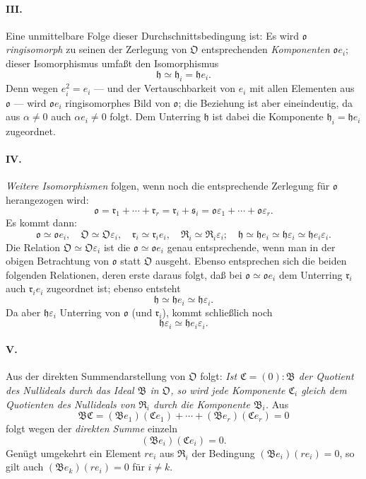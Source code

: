 \paragraph{III.}
Eine unmittelbare Folge dieser Durchschnittsbedingung ist: Es wird $\mathfrak o$ \emph{ringisomorph} zu seinen der Zerlegung von $\mathfrak O$ entsprechenden \emph{Komponenten} $\mathfrak o e_i$; dieser Isomorphismus umfaßt den Isomorphismus
\[
\mathfrak h\simeq\mathfrak h_i=\mathfrak h e_i.
\]
Denn wegen $e_i^2=e_i$ --- und der Vertauschbarkeit von $e_i$ mit allen Elementen aus $\mathfrak o$ --- wird $\mathfrak o e_i$ ringisomorphes Bild von $\mathfrak o$; die Beziehung ist aber eineindeutig, da aus $\alpha\ne0$ auch $\alpha e_i\ne0$ folgt. Dem Unterring $\mathfrak h$ ist dabei die Komponente $\mathfrak h_i=\mathfrak h e_i$ zugeordnet.

\paragraph{IV.}
\emph{Weitere Isomorphismen} folgen, wenn noch die entsprechende Zerlegung für $\mathfrak o$ herangezogen wird:
\[
\mathfrak o=\mathfrak r_1+\cdots+\mathfrak r_r
=\mathfrak r_i+\mathfrak s_i
=\mathfrak o\varepsilon_1+\cdots+\mathfrak o\varepsilon_r.
\]
Es kommt dann:
\[
\mathfrak o\simeq\mathfrak o e_i,
\quad \mathfrak O\simeq\mathfrak O\varepsilon_i,
\quad \mathfrak r_i\simeq\mathfrak r_i e_i,
\quad \mathfrak R_i\simeq\mathfrak R_i\varepsilon_i;
\quad \mathfrak h\simeq\mathfrak h e_i\simeq\mathfrak h\varepsilon_i\simeq\mathfrak h e_i\varepsilon_i.
\]
Die Relation $\mathfrak O\simeq\mathfrak O\varepsilon_i$ ist die $\mathfrak o\simeq\mathfrak o e_i$ genau entsprechende, wenn man in der obigen Betrachtung von $\mathfrak o$ statt $\mathfrak O$ ausgeht. Ebenso entsprechen sich die beiden folgenden Relationen, deren erste daraus folgt, daß bei $\mathfrak o\simeq\mathfrak o e_i$ dem Unterring $\mathfrak r_i$ auch $\mathfrak r_i e_i$ zugeordnet ist; ebenso entsteht
\[
\mathfrak h\simeq\mathfrak h e_i\simeq\mathfrak h\varepsilon_i.
\]
Da aber $\mathfrak h\varepsilon_i$ Unterring von $\mathfrak o$ (und $\mathfrak r_i$), kommt schließlich noch
\[
\mathfrak h\varepsilon_i\simeq\mathfrak h e_i\varepsilon_i.
\]

\paragraph{V.}
Aus der direkten Summendarstellung von $\mathfrak O$ folgt: \emph{Ist $\mathfrak C=(0):\mathfrak B$ der Quotient des Nullideals durch das Ideal $\mathfrak B$ in $\mathfrak O$, so wird jede Komponente $\mathfrak C_i$ gleich dem Quotienten des Nullideals von $\mathfrak R_i$ durch die Komponente $\mathfrak B_i$.} Aus
\[
\mathfrak B\mathfrak C=(\mathfrak B e_1)(\mathfrak C e_1)+\cdots+(\mathfrak B e_r)(\mathfrak C e_r)=0
\]
folgt wegen der \emph{direkten Summe} einzeln
\[
(\mathfrak B e_i)(\mathfrak C e_i)=0.
\]
Genügt umgekehrt ein Element $r e_i$ aus $\mathfrak R_i$ der Bedingung $(\mathfrak B e_i)(r e_i)=0$, so gilt auch $(\mathfrak B e_k)(r e_i)=0$ für $i\ne k$.

